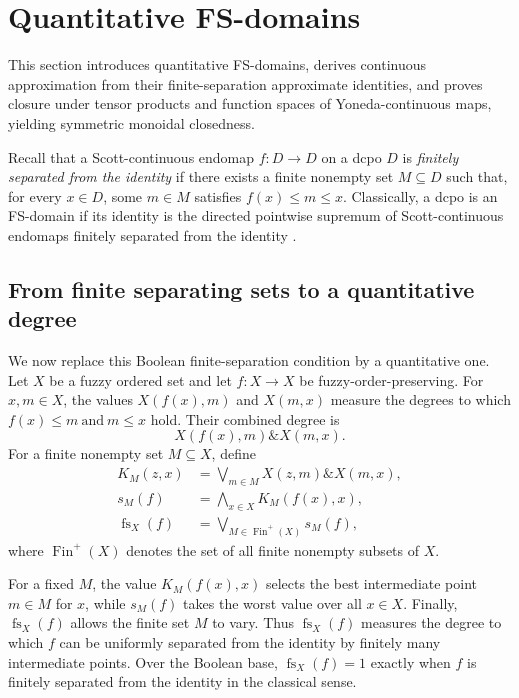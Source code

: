 \documentclass[preprint,3p,times]{elsarticle}
\theoremstyle{definition}
\theoremstyle{remark}
\newcommand{\fs}{\operatorname{fs}}
\newcommand{\Finp}{\operatorname{Fin}^{+}}
\newcommand{\tn}{\mathbin{\&}}
\numberwithin{equation}{section}
\begin{document}
\section{Quantitative FS-domains}\label{sec:qfs}

This section introduces quantitative FS-domains, derives continuous approximation from their finite-separation approximate identities, and proves closure under tensor products and function spaces of Yoneda-continuous maps, yielding symmetric monoidal closedness. 

Recall that a Scott-continuous endomap \(f\colon D\to D\) on a dcpo \(D\) is \emph{finitely separated from the identity} if there exists a finite nonempty set \(M\subseteq D\) such that, for every \(x\in D\), some \(m\in M\) satisfies
\(
f(x)\leq m\leq x.
\)
Classically, a dcpo is an FS-domain if its identity is the directed pointwise supremum of Scott-continuous endomaps finitely separated from the identity \cite{AbramskyJung1994}. 

\subsection{From finite separating sets to a quantitative degree}

We now replace this Boolean finite-separation condition by a quantitative one. Let \(X\) be a fuzzy ordered set and let \(f\colon X\to X\) be fuzzy-order-preserving. For \(x,m\in X\), the values \(X(f(x),m)\) and \(X(m,x)\) measure the degrees to which
\(
f(x)\leq m
\  \text{and}\
m\leq x
\)
hold. Their combined degree is
\[
X(f(x),m)\tn X(m,x).
\]
For a finite nonempty set \(M\subseteq X\), define
\begin{align}
K_M(z,x)
&=
\bigvee_{m\in M}
X(z,m)\tn X(m,x),
\label{eq:finite-kernel}\\
s_M(f)
&=
\bigwedge_{x\in X}K_M(f(x),x),\\
\fs_X(f)
&=
\bigvee_{M\in\Finp(X)}s_M(f),
\label{eq:finite-separation-degree}
\end{align}
where \(\Finp(X)\) denotes the set of all finite nonempty subsets of \(X\).

For a fixed \(M\), the value \(K_M(f(x),x)\) selects the best intermediate point \(m\in M\) for \(x\), while \(s_M(f)\) takes the worst value over all \(x\in X\). Finally, \(\fs_X(f)\) allows the finite set \(M\) to vary. Thus \(\fs_X(f)\) measures the degree to which \(f\) can be uniformly separated from the identity by finitely many intermediate points.
Over the Boolean base, \(\fs_X(f)=1\) exactly when \(f\) is finitely separated from the identity in the classical sense.
\end{document}
